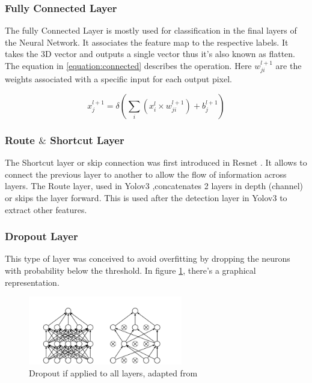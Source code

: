 \subsubsection{Fully Connected Layer}

The fully Connected Layer is mostly used for classification in the final layers of the Neural Network. It associates the feature map to the respective labels.
It takes the 3D vector and outputs a single vector thus it's also known as flatten.
 The equation in \ref{equation:connected} describes the operation. Here $w_{ji}^{l+1}$ are the weights
 associated with a specific input for each output pixel.



\begin{equation} \label{equation:connected}
     \displaystyle x_{j}^{l+1}=\delta (\sum_{i}(x_{i}^{l} \times w_{ji}^{l+1})+ b_{j}^{l+1})
 \end{equation}
 


\subsubsection{Route $\&$ Shortcut Layer}

The Shortcut layer or skip connection was first introduced in Resnet \cite{resnet}.
It allows to connect the previous layer to another to allow the flow of information across layers.
The Route layer, used in Yolov3 \cite{yolov3}
,concatenates 2 layers in depth (channel) or skips the layer forward. This is used after the detection layer in Yolov3 to extract other features.

\subsubsection{Dropout Layer}

This type of layer was conceived to avoid overfitting \cite{Dropout}
by dropping the neurons with probability below the threshold. In figure \ref{figure:Dropout}, there's a
graphical representation.
\begin{figure}[!htbp]
    \centering
    \includegraphics[width=0.6\textwidth]{Figures/dropout.png}
    \caption{Dropout if applied to all layers, adapted from~\cite{Dropout}}
    \label{figure:Dropout}
\end{figure} 

